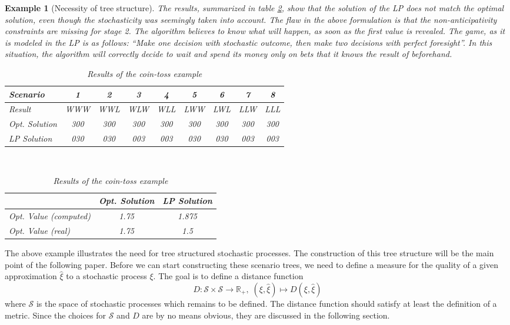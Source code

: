 \documentclass[a4paper, 12pt] {article}
\newtheorem*{example}{Example}
\begin{document}
\begin{example}[Necessity of tree structure]
The results, summarized in table \ref{tab:coin-toss-results}, show that the solution of the LP does not match the optimal solution, even though the stochasticity was seemingly taken into account. 
The flaw in the above formulation is that the non-anticipativity constraints are missing for stage 2. 
The algorithm believes to know what will happen, as soon as the first value is revealed. 
The game, as it is modeled in the LP is as follows: 
``Make one decision with stochastic outcome, then make two decisions with perfect foresight''. 
In this situation, the algorithm will correctly decide to wait and spend its money only on bets that it knows the result of beforehand.
\begin{table}
  \small\centering
  \begin{tabular}{lcccccccc}
    \hline 
    Scenario&1&2&3&4&5&6&7&8\\\hline\hline
    Result&WWW&WWL&WLW&WLL&LWW&LWL&LLW&LLL\\
    Opt. Solution&300&300&300&300&300&300&300&300\\
    LP Solution&030&030&003&003&030&030&003&003\\\hline
  \end{tabular}
  \vspace*{0.5cm}\\
  \begin{tabular}{lcc}
    \hline
    &Opt. Solution&LP Solution\\\hline\hline
    Opt. Value (computed)&1.75&1.875\\
    Opt. Value (real)&1.75&1.5\\
    \hline
  \end{tabular}
  \caption{Results of the coin-toss example}
  \label{tab:coin-toss-results}
\end{table}
\end{example}

The above example illustrates the need for tree structured stochastic processes. The construction of this tree structure will be the main point of the following paper. Before we can start constructing these scenario trees, we need to define a measure for the quality of a given approximation $\hat{\xi}$ to a stochastic process $\xi$. The goal is to define a distance function 
\begin{equation}
  \label{eq:distance-function-intro}
  D:\mathcal{S} \times \mathcal{S} \rightarrow \mathbb{R}_+,\;(\xi, \hat{\xi})\mapsto D(\xi, \hat{\xi})
\end{equation}
where $\mathcal{S}$ is the space of stochastic processes which remains to be defined. The distance function should satisfy at least the definition of a metric. Since the choices for $\mathcal{S}$ and $D$ are by no means obvious, they are discussed in the following section.
\end{document}
